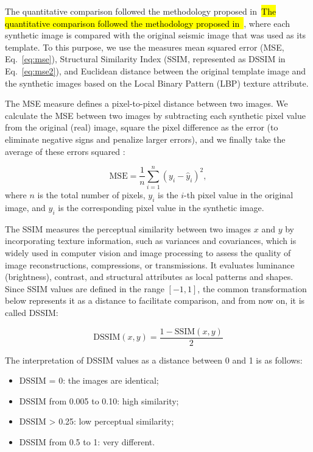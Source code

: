 \documentclass{ieeeaccess}
\DeclareRobustCommand{\DIFaddbegin}{\DIFOaddbegin \let\includegraphics\DIFaddincludegraphics} %
\DeclareRobustCommand{\DIFaddend}{\DIFOaddend \let\includegraphics\DIFOincludegraphics} %
\providecommand{\DIFadd}[1]{{\protect\color{blue}#1}}
\renewcommand{\DIFadd}[1]{\ifmmode#1\else\begingroup\let\protect\relax\hl{#1}\endgroup\fi}
\providecommand{\DIFaddbegin}{}
\providecommand{\DIFaddend}{}
\renewcommand{\DIFaddbegin}{}
\renewcommand{\DIFaddend}{}
\begin{document}
\DIFaddbegin \DIFadd{The quantitative comparison followed the methodology proposed in~\cite{Ferreira2020}}\DIFaddend, where each synthetic image is compared with the original seismic image that was used as its template. To this purpose, we use the measures mean squared error (MSE, Eq.~\ref{eq:mse}), Structural Similarity Index (SSIM, represented as DSSIM in Eq.~\ref{eq:mse2}), and Euclidean distance between the original template image and the synthetic images based on the Local Binary Pattern (LBP) texture attribute.

The MSE measure defines a pixel-to-pixel distance between two images. We calculate the MSE between two images by   subtracting each synthetic pixel value from the original (real) image, square the pixel difference as the error (to eliminate  negative signs and penalize larger errors), and we finally take the average of these errors squared :

\begin{equation}
\label{eq:mse}
\text{MSE} = \frac{1}{n} \sum_{i=1}^{n} (y_i - \hat{y}_i)^2,
\end{equation}
where $n$ is the total number of pixels, $y_i$ is the $i$-th pixel value in the original image, and $\hat{y}_i$ is the corresponding pixel value in the synthetic image.

The SSIM measures the perceptual similarity between two images $x$ and $y$ by incorporating texture information, such as variances and covariances, which is widely used in computer vision and image processing to assess the quality of image reconstructions, compressions, or transmissions. It evaluates luminance (brightness), contrast, and structural attributes as local patterns and shapes. Since SSIM values are defined in the range $[-1, 1]$, the common transformation below  represents it as a distance to facilitate comparison, and from now on, it is called DSSIM:

\begin{equation}
\label{eq:mse2}
\text{DSSIM}(x, y) = \frac{1 - \text{SSIM}(x, y)}{2}
\end{equation}

The interpretation of DSSIM values as a distance between 0 and 1 is as follows: 

\begin{itemize}
    \item DSSIM = 0: the images are identical;
    \item DSSIM from 0.005 to 0.10: high similarity;
    \item DSSIM > 0.25: low perceptual similarity;
    \item DSSIM from 0.5 to 1: very different.
\end{itemize}
\end{document}
